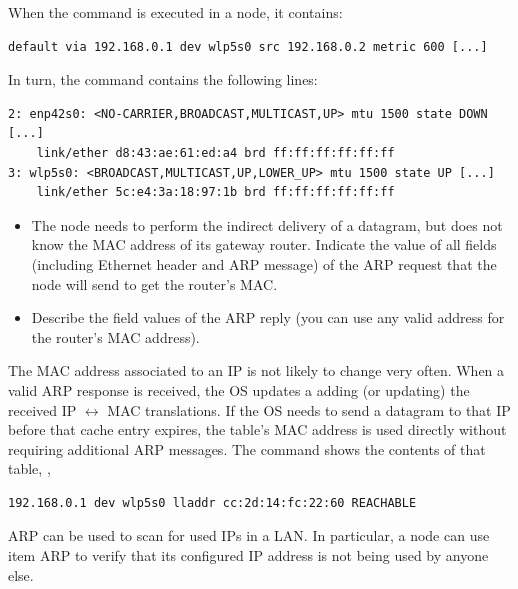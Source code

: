 \begin{exercise}
When the  command is executed in a node, it contains:

\begin{verbatim}
default via 192.168.0.1 dev wlp5s0 src 192.168.0.2 metric 600 [...]
\end{verbatim}

In turn, the  command contains the following lines:

\begin{verbatim}
2: enp42s0: <NO-CARRIER,BROADCAST,MULTICAST,UP> mtu 1500 state DOWN [...]
    link/ether d8:43:ae:61:ed:a4 brd ff:ff:ff:ff:ff:ff
3: wlp5s0: <BROADCAST,MULTICAST,UP,LOWER_UP> mtu 1500 state UP [...]
    link/ether 5c:e4:3a:18:97:1b brd ff:ff:ff:ff:ff:ff 
\end{verbatim}

\begin{itemize}
\item The node needs to perform the indirect delivery of a datagram,
but does not know the MAC address of its gateway router. Indicate the value of 
all fields (including Ethernet header and ARP message) of the ARP request 
that the node will send to get the router's MAC.

\item Describe the field values of the ARP reply (you can use any valid address
      for the router's MAC address).
\end{itemize}
\end{exercise}

The MAC address associated to an IP is not likely to change very often.
When a valid ARP response is received, the OS updates a 
 adding (or updating) the received IP $\leftrightarrow$ MAC translations.
% 
If the OS needs to send a datagram to that IP before that cache entry expires,
the table's MAC address is used directly without requiring additional ARP messages.
% 
The  command shows the contents of that table, \eg,
\begin{verbatim}
192.168.0.1 dev wlp5s0 lladdr cc:2d:14:fc:22:60 REACHABLE
\end{verbatim}

\begin{remark}
ARP can be used to scan for used IPs in a LAN.
In particular, a node can use item ARP to verify that its configured IP address is not being used by anyone else.
\end{remark}

